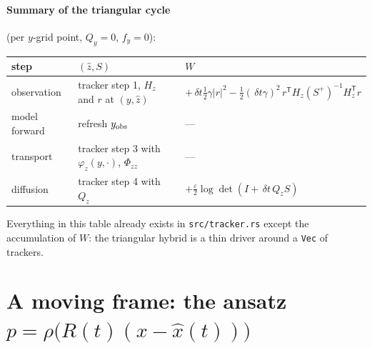 \documentclass[11pt,a4paper]{article}
\newcommand{\T}{^{\mathsf T}}
\newcommand{\xh}{\hat{x}}
\newcommand{\zh}{\hat{z}}
\newcommand{\eps}{\varepsilon}
\newcommand{\abs}[1]{\left\lvert #1 \right\rvert}
\newcommand{\dt}{\,\delta t}
\theoremstyle{plain}
\theoremstyle{definition}
\theoremstyle{remark}
\begin{document}
\paragraph{Summary of the triangular cycle} (per $y$-grid point, $Q_y=0$, $f_y=0$):
\begin{center}\small
\begin{tabular}{@{}lll@{}}
\toprule
step & $(\zh,S)$ & $W$ \\
\midrule
observation & tracker step 1, $H_z$ and $r$ at $(y,\zh)$ & $+\dt\tfrac12\gamma\abs r^2 - \tfrac12(\dt\gamma)^2\, r\T H_z(S^+)^{-1}H_z\T r$ \\
model forward & refresh $y_{\rm obs}$ & --- \\
transport & tracker step 3 with $\varphi_z(y,\cdot)$, $\Phi_{zz}$ & --- \\
diffusion & tracker step 4 with $Q_z$ & $+\tfrac{\eps}{2}\log\det(I+\dt\,Q_zS)$ \\
\bottomrule
\end{tabular}
\end{center}
Everything in this table already exists in \texttt{src/tracker.rs} except the accumulation of $W$: the triangular hybrid is a thin driver around a \texttt{Vec} of trackers.

\section{A moving frame: the ansatz \texorpdfstring{$p=\rho\big(R(t)(x-\xh(t))\big)$}{p = rho(R(x - xhat))}}
\label{sec:frame}
\end{document}
